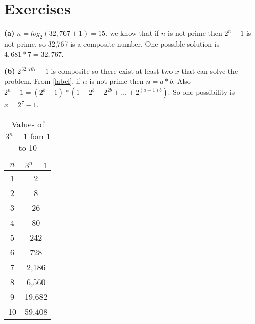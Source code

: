 \section{Exercises}


\sol \textbf{(a)} $n = log_2(32,767+1) = 15$, we know that if $n$ is not prime then $2^n - 1$ is not prime, so 32,767 is a composite number. 
One possible solution is $4,681 * 7 = 32,767$.

\sol \textbf{(b)} $2^{32,767} - 1$ is composite so there exist at least two $x$ that can solve the problem.
From \ref{label}, if $n$ is not prime then $n = a*b$.
Also $2^n - 1 = (2^b - 1) * (1 + 2^b + 2^{2b} + \ldots + 2^{(a-1)b})$.
So one possibility is $x = 2^7 - 1$.


\sol \begin{table}[h]
  \centering
  \label{tab:3n_minus_1}
  \begin{tabular}{|c|c|}
    \hline
    $n$ & $3^n - 1$\\
    \hline
    1 & 2\\
    2 & 8\\
    3 & 26\\
    4 & 80\\
    5 & 242\\
    6 & 728\\
    7 & 2,186\\
    8 & 6,560\\
    9 & 19,682\\
    10 & 59,408\\
    \hline
  \end{tabular}
  \caption{Values of $3^n - 1$ fom 1 to 10}
\end{table}


